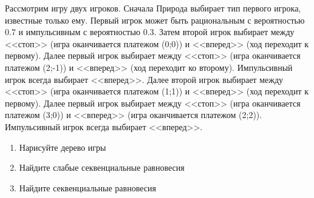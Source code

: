 \begin{problem}

Рассмотрим игру двух игроков. Сначала Природа выбирает тип первого игрока, известные только ему. Первый игрок может быть рациональным с вероятностью 0.7 и импульсивным с вероятностью 0.3. Затем второй игрок выбирает между <<стоп>> (игра оканчивается  платежом (0;0)) и <<вперед>> (ход переходит к первому). Далее первый игрок выбирает между <<стоп>> (игра оканчивается платежом (2;-1)) и <<вперед>> (ход переходит ко второму). Импульсивный игрок всегда выбирает <<вперед>>. Далее второй игрок выбирает между <<стоп>> (игра оканчивается платежом (1;1)) и <<вперед>> (ход переходит к первому). Далее первый игрок выбирает между <<стоп>> (игра оканчивается платежом (3;0)) и <<вперед>> (игра оканчивается платежом (2;2)). Импульсивный игрок всегда выбирает <<вперед>>. \par
\begin{enumerate}
\item Нарисуйте дерево игры \par
\item Найдите слабые секвенциальные равновесия \par
\item  Найдите секвенциальные равновесия \par
\begin{source}
\cite{lones:dtc}
\end{source}
\end{enumerate}


\begin{sol}

\end{sol}
\end{problem}



